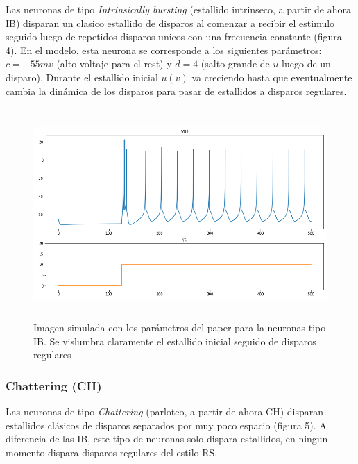 \documentclass[12pt]{article}
\begin{document}
Las neuronas de tipo \textit{Intrinsically bursting} (estallido intrinseco, a partir de ahora IB)
disparan un clasico estallido de disparos al comenzar a recibir el estimulo seguido luego de repetidos disparos unicos con una frecuencia constante (figura 4).
En el modelo, esta neurona se corresponde a los siguientes parámetros: $c = -55 mv$ (alto voltaje para el rest) y $d = 4$ (salto grande de $u$ luego de un disparo).
Durante el estallido inicial $u(v)$ va creciendo hasta que eventualmente cambia la dinámica de los disparos para pasar de estallidos a disparos regulares. \\


\begin{figure}[h!]
    \centering
        \includegraphics[height=8cm]{images/IB.png}
    \caption[fontsize=2pt]{Imagen simulada con los parámetros del paper para la neuronas tipo IB. Se vislumbra claramente el estallido inicial seguido de disparos regulares}
\end{figure}
\newpage

 \subsubsection{Chattering (CH)}

 Las neuronas de tipo \textit{Chattering} (parloteo, a partir de ahora CH) disparan estallidos clásicos de disparos separados por muy poco espacio (figura 5). A diferencia de las IB, este tipo de neuronas solo dispara estallidos, en ningun momento dispara disparos regulares del estilo RS.
\end{document}
